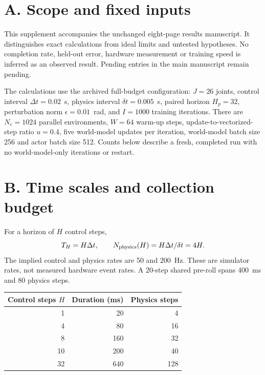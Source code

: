 \documentclass[letterpaper,10pt,conference]{ieeeconf}
\begin{document}

\section*{A. Scope and fixed inputs}
This supplement accompanies the unchanged eight-page results manuscript. It distinguishes exact calculations from ideal limits and untested hypotheses. No completion rate, held-out error, hardware measurement or training speed is inferred as an observed result. Pending entries in the main manuscript remain pending.

The calculations use the archived full-budget configuration: $J=26$ joints, control interval $\Delta t=0.02$~s, physics interval $\delta t=0.005$~s, paired horizon $H_p=32$, perturbation norm $\epsilon=0.01$~rad, and $I=1000$ training iterations. There are $N_e=1024$ parallel environments, $W=64$ warm-up steps, update-to-vectorized-step ratio $u=0.4$, five world-model updates per iteration, world-model batch size 256 and actor batch size 512. Counts below describe a fresh, completed run with no world-model-only iterations or restart.

\section*{B. Time scales and collection budget}
For a horizon of $H$ control steps,
\begin{equation}
 T_H=H\Delta t,\qquad N_{\rm physics}(H)=H\Delta t/\delta t=4H.
\end{equation}
The implied control and physics rates are 50 and 200~Hz. These are simulator rates, not measured hardware event rates. A 20-step shared pre-roll spans 400~ms and 80 physics steps.

\begin{center}
\small
\begin{tabular}{@{}rrr@{}}
\toprule
Control steps $H$ & Duration (ms) & Physics steps \\
\midrule
1 & 20 & 4 \\
4 & 80 & 16 \\
8 & 160 & 32 \\
10 & 200 & 40 \\
32 & 640 & 128 \\
\bottomrule
\end{tabular}
\end{center}
\end{document}
